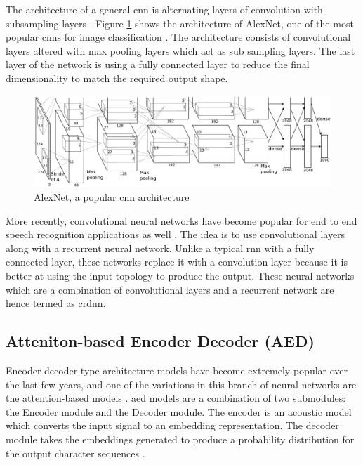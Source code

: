 The architecture of a general \acrshort{cnn} is alternating layers of convolution with subsampling layers \cite{Ciresan2011FlexibleClassification}. Figure \ref{fig:cnn} shows the architecture of AlexNet, one of the most popular \acrshort{cnn}s for image classification \cite{Krizhevsky2012ImageNetNetworks}. The architecture consists of convolutional layers altered with max pooling layers which act as sub sampling layers. The last layer of the network is using a fully connected layer to reduce the final dimensionality to match the required output shape.
\begin{figure}[ht]
  \begin{center}
    \includegraphics[width=\textwidth]{images/cnn.png} 
    \caption{AlexNet, a popular \acrshort{cnn} architecture  \cite{Krizhevsky2012ImageNetNetworks}}
    \label{fig:cnn}
  \end{center}
\end{figure}

More recently, convolutional neural networks have become popular for end to end speech recognition applications as well \cite{Zhang2017VeryRecognition}. The idea is to use convolutional layers along with a recurrent neural network. Unlike a typical \acrshort{rnn} with a fully connected layer, these networks replace it with a convolution layer because it is better at using the input topology to produce the output. These neural networks which are a combination of convolutional layers and a recurrent network are hence termed as \acrfull{crdnn}. 

\subsection {Atteniton-based Encoder Decoder (AED)}
Encoder-decoder type architecture models have become extremely popular over the last few years, and one of the variations in this branch of neural networks are the attention-based models \cite{Prabhavalkar2017ARecognition}. \acrfull{aed} models are a combination of two submodules: the Encoder module and the Decoder module. The encoder is an acoustic model which converts the input signal to an embedding representation. The decoder module takes the embeddings generated to produce a probability distribution for the output character sequences \cite{Zhang2017VeryRecognition, Chan2016ListenRecognition}.

